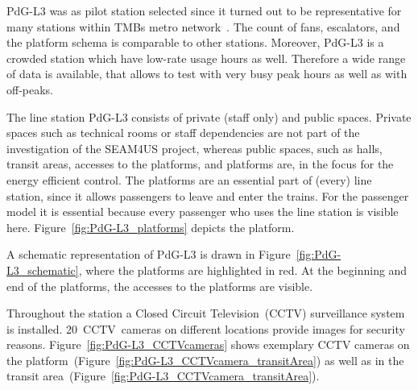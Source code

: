 PdG-L3 was as pilot station selected since it turned out to be representative for many stations within TMBs metro network~\cite{TMB_2014}. 
The count of fans, escalators, and the platform schema is comparable to other stations. 
Moreover, PdG-L3 is a crowded station which have low-rate usage hours as well. 
Therefore a wide range of data is available, that allows to test with very busy peak hours as well as with off-peaks.

\label{subsec:PdG-L3_spaces}

The line station PdG-L3 consists of private (staff only) and public spaces. 
Private spaces such as technical rooms or staff dependencies are not part of the investigation of the SEAM4US project, whereas public spaces, such as halls, transit areas, accesses to the platforms, and platforms are, in the focus for the energy efficient control.
The platforms are an essential part of (every) line station, since it allows passengers to leave and enter the trains. 
For the passenger model it is essential because every passenger who uses the line station is visible here. 
Figure~\ref{fig:PdG-L3_platforms} depicts the platform. 



A schematic representation of PdG-L3 is drawn in Figure~\ref{fig:PdG-L3_schematic}, where the platforms are highlighted in red. At the beginning and end of the platforms, the accesses to the platforms are visible.



\label{subsec:CCTVSystem}

Throughout the station a Closed Circuit Television~(CCTV) surveillance system is installed. 
20~CCTV~cameras on different locations provide images for security reasons. 
Figure~\ref{fig:PdG-L3_CCTVcameras} shows exemplary CCTV cameras on the platform~(Figure~\ref{fig:PdG-L3_CCTVcamera_transitArea}) as well as in the transit area~(Figure~\ref{fig:PdG-L3_CCTVcamera_transitArea}).


